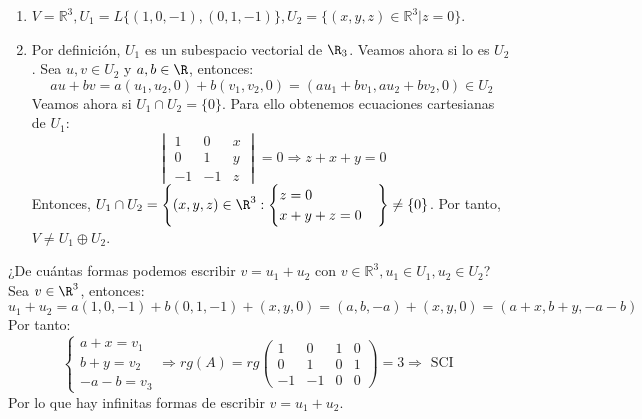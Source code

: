 \begin{ejercicio}
\begin{enumerate}
		\item \( V = \mathbb{R}^3, U_1 = L\{(1,0,-1), (0,1,-1)\}, U_2 = \{(x,y,z) \in \mathbb{R}^3 | z = 0\} \).
		\item Por definición, $U_1$ es un subespacio vectorial de $\R_3$. Veamos ahora si lo es $U_2$. Sea
		      $u, v \in U_2$ y $a, b \in \R$, entonces:
		      \begin{equation*}
			      au + bv = a(u_1, u_2, 0) + b(v_1, v_2, 0) = (au_1 + bv_1, au_2 + bv_2, 0) \in U_2
		      \end{equation*}
		      Veamos ahora si $U_1 \cap U_2 = \{0\}$. Para ello obtenemos ecuaciones cartesianas de $U_1$:
		      \begin{equation*}
			      \begin{vmatrix}
				      1  & 0  & x \\
				      0  & 1  & y \\
				      -1 & -1 & z
			      \end{vmatrix} = 0 \Rightarrow z + x + y = 0
		      \end{equation*}
		      Entonces, $U_1 \cap U_2 = \left\{ (x,y,z) \in \R^3 : \begin{cases}
				      z = 0 \\
				      x + y + z = 0
			      \end{cases} \right\} \neq \{0\}$. Por tanto, $V \neq U_1 \oplus U_2$.
	\end{enumerate}
	¿De cuántas formas podemos escribir \( v = u_1 + u_2 \) con \( v \in \mathbb{R}^3, u_1 \in U_1, u_2 \in U_2 \)?
	Sea $v \in \R^3$, entonces:
	\begin{equation*}
		u_1 + u_2 = a(1,0,-1) + b(0,1,-1) + (x,y,0) = (a, b, -a) + (x, y, 0) = (a + x, b + y, -a-b)
	\end{equation*}
	Por tanto:
	\begin{equation*}
		\begin{cases}
			a + x = v_1 \\
			b + y = v_2 \\
			-a - b = v_3
		\end{cases} \Rightarrow rg(A) = rg\begin{pmatrix}
			1  & 0  & 1 & 0 \\
			0  & 1  & 0 & 1 \\
			-1 & -1 & 0 & 0
		\end{pmatrix} = 3 \Rightarrow \text{ SCI }
	\end{equation*}
	Por lo que hay infinitas formas de escribir $v = u_1 + u_2$.
\end{ejercicio}




